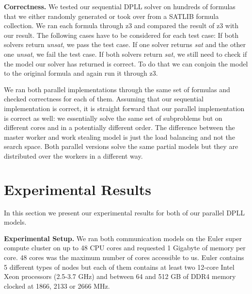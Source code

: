 \documentclass[letterpaper]{article}
\newcommand{\mypar}[1]{{\bf #1.}}
\begin{document}
\mypar{Correctness}
We tested our sequential DPLL solver on hundreds of formulas that we either randomly generated or took over from a SATLIB formula collection. \cite{cnf_website}
We ran each formula through z3 \cite{z3} and compared the result of z3 with our result.
The following cases have to be considered for each test case:
If both solvers return \textit{unsat}, we pass the test case.
If one solver returns \textit{sat} and the other one \textit{unsat}, we fail the test case.
If both solvers return \textit{sat}, we still need to check if the model our solver has returned is correct.
To do that we can conjoin the model to the original formula and again run it through z3.

We ran both parallel implementations through the same set of formulas and checked correctness for each of them.
Assuming that our sequential implementation is correct, it is straight forward that our parallel implementation is correct as well:
we essentially solve the same set of subproblems but on different cores and in a potentially different order.
The difference between the master worker and work stealing model is just the load balancing and not the search space.
Both parallel versions solve the same partial models but they are distributed over the workers in a different way.

\section{Experimental Results}\label{sec:exp}
In this section we present our experimental results for both of our parallel DPLL models.

\mypar{Experimental Setup}
We ran both communication models on the Euler super compute cluster \cite{euler} on up to 48 CPU cores and requested 1 Gigabyte of memory per core.
48 cores was the maximum number of cores accessible to us.
Euler contains 5 different types of nodes but each of them contains at least two 12-core Intel Xeon processors (2.5-3.7 GHz) and between 64 and 512 GB of DDR4 memory clocked at 1866, 2133 or 2666 MHz.
\end{document}
